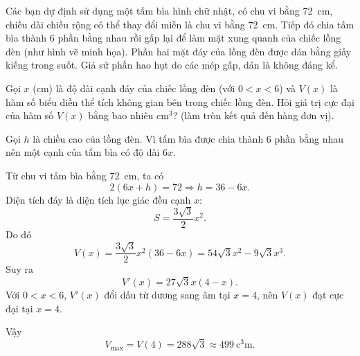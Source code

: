 \begin{baitap}
\begin{center}
	\end{center}
	Các bạn dự định sử dụng một tấm bìa hình chữ nhật, có chu vi bằng \qty{72}{\centi\meter}, chiều dài chiều rộng có thể thay đổi miễn là chu vi bằng \qty{72}{\centi\meter}. Tiếp đó chia tấm bìa thành 6 phần bằng nhau rồi gấp lại để làm mặt xung quanh của chiếc lồng đèn (như hình vẽ minh họa). Phần hai mặt đáy của lồng đèn được dán bằng giấy kiếng trong suốt. Giả sử phần hao hụt do các mép gấp, dán là không đáng kể.
	
	Gọi $x$ (cm) là độ dài cạnh đáy của chiếc lồng đèn (với $0 < x < 6$) và $V(x)$ là hàm số biểu diễn thể tích không gian bên trong chiếc lồng đèn. Hỏi giá trị cực đại của hàm số $V(x)$ bằng bao nhiêu $ \mathrm{cm^3} $? (làm tròn kết quả đến hàng đơn vị).
	\begin{traloi}
		Gọi $h$ là chiều cao của lồng đèn. Vì tấm bìa được chia thành $6$ phần bằng nhau nên một cạnh của tấm bìa có độ dài $6x$.
		
		Từ chu vi tấm bìa bằng \qty{72}{\centi\meter}, ta có
		\[
		2(6x+h)=72\Rightarrow h=36-6x.
		\]
		Diện tích đáy là diện tích lục giác đều cạnh $x$:
		\[
		S=\frac{3\sqrt{3}}{2}x^2.
		\]
		Do đó
		\[
		V(x)=\frac{3\sqrt{3}}{2}x^2(36-6x)
		=54\sqrt{3}x^2-9\sqrt{3}x^3.
		\]
		Suy ra
		\[
		V'(x)=27\sqrt{3}x(4-x).
		\]
		Với $0<x<6$, $V'(x)$ đổi dấu từ dương sang âm tại $x=4$, nên $V(x)$ đạt cực đại tại $x=4$.
		
		Vậy
		\[
		V_{\max}=V(4)=288\sqrt{3}\approx499\ \unit{\cubic\centi\meter}.
		\]
	\end{traloi}
\end{baitap}